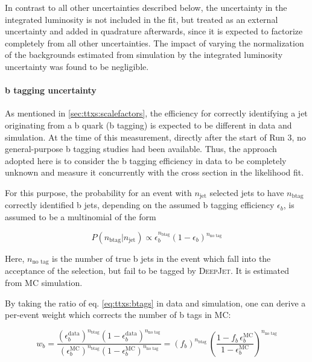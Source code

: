In contrast to all other uncertainties described below, the uncertainty in the integrated luminosity is not included in the fit, but treated as an external uncertainty and added in quadrature afterwards, since it is expected to factorize completely from all other uncertainties.
The impact of varying the normalization of the backgrounds estimated from simulation by the integrated luminosity uncertainty was found to be negligible.

\paragraph{b tagging uncertainty}

As mentioned in \cref{sec:ttxs:scalefactors}, the efficiency for correctly identifying a jet originating from a b quark (b tagging) is expected to be different in data and simulation. At the time of this measurement, directly after the start of Run 3, no general-purpose b tagging studies had been available. Thus, the approach adopted here is to consider the b tagging efficiency in data to be completely unknown and measure it concurrently with the cross section in the likelihood fit.

For this purpose, the probability for an event with $n_{\mathrm{jet}}$ selected jets to have $n_{\mathrm{b tag}}$ correctly identified b jets, depending on the assumed b tagging efficiency $\epsilon_b$, is assumed to be a multinomial of the form

\begin{equation}
\label{eq:ttxs:btags}
    P (n_{\mathrm{b tag}} | n_{\mathrm{jet}}) \propto \epsilon_b^{n_{\mathrm{b tag}}} (1 - \epsilon_b)^{ n_{\text{no tag}}}
\end{equation}

Here, $n_{\text{no tag}}$ is the number of true b jets in the event which fall into the acceptance of the selection, but fail to be tagged by \textsc{DeepJet}. It is estimated from MC simulation. %

By taking the ratio of eq. \ref{eq:ttxs:btags} in data and simulation, one can derive a per-event weight which corrects the number of b tags in MC:

\begin{equation}
\label{eq:ttxs:btagsf}
    w_b = \frac
    {(\epsilon_b^{\mathrm{data}})^{n_{\mathrm{b tag}}} (1 - \epsilon_b^{\mathrm{data}})^{n_{\text{no tag}}}}
    {(\epsilon_b^{\mathrm{MC}})^{n_{\mathrm{b tag}}} (1 - \epsilon_b^{\mathrm{MC}})^{n_{\text{no tag}}}} 
    = (f_b)^{n_{\mathrm{b tag}}} \, \left( \frac{1 - f_b \, \epsilon_b^{\mathrm{MC}}}{1 - \epsilon_b^{\mathrm{MC}}} \right)^{n_{\text{no tag}}}
\end{equation}

